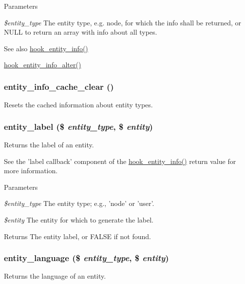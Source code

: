 \begin{DoxyParams}{Parameters}
\item[{\em \$entity\_\-type}]The entity type, e.g. node, for which the info shall be returned, or NULL to return an array with info about all types.\end{DoxyParams}
\begin{DoxySeeAlso}{See also}
\hyperlink{group__hooks_gaf02318e9d0e8cdbf6d187b271b9969a8}{hook\_\-entity\_\-info()} 

\hyperlink{group__hooks_ga0394a72e4872603e91ce22440195ab45}{hook\_\-entity\_\-info\_\-alter()} 
\end{DoxySeeAlso}
\hypertarget{common_8inc_a1905abb5de031d0030e680de4634fc66}{
\subsubsection[{entity\_\-info\_\-cache\_\-clear}]{\setlength{\rightskip}{0pt plus 5cm}entity\_\-info\_\-cache\_\-clear ()}}
\label{common_8inc_a1905abb5de031d0030e680de4634fc66}
Resets the cached information about entity types. \hypertarget{common_8inc_aa9868513964b440f8206571573b833b3}{
\subsubsection[{entity\_\-label}]{\setlength{\rightskip}{0pt plus 5cm}entity\_\-label (\$ {\em entity\_\-type}, \/  \$ {\em entity})}}
\label{common_8inc_aa9868513964b440f8206571573b833b3}
Returns the label of an entity.

See the 'label callback' component of the \hyperlink{group__hooks_gaf02318e9d0e8cdbf6d187b271b9969a8}{hook\_\-entity\_\-info()} return value for more information.


\begin{DoxyParams}{Parameters}
\item[{\em \$entity\_\-type}]The entity type; e.g., 'node' or 'user'. \item[{\em \$entity}]The entity for which to generate the label.\end{DoxyParams}
\begin{DoxyReturn}{Returns}
The entity label, or FALSE if not found. 
\end{DoxyReturn}
\hypertarget{common_8inc_abd1bd4466071377d474040174c49f06b}{
\subsubsection[{entity\_\-language}]{\setlength{\rightskip}{0pt plus 5cm}entity\_\-language (\$ {\em entity\_\-type}, \/  \$ {\em entity})}}
\label{common_8inc_abd1bd4466071377d474040174c49f06b}
Returns the language of an entity.


